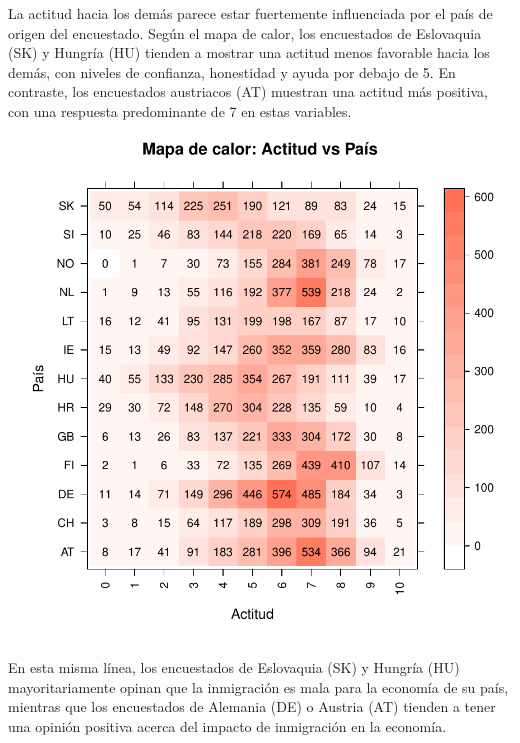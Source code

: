 \documentclass{article}
\begin{document}
La actitud hacia los demás parece estar fuertemente influenciada por el país de origen del encuestado. Según el mapa de calor, los encuestados de Eslovaquia (SK) y Hungría (HU) tienden a mostrar una actitud menos favorable hacia los demás, con niveles de confianza, honestidad y ayuda por debajo de 5. En contraste, los encuestados austriacos (AT) muestran una actitud más positiva, con una respuesta predominante de 7 en estas variables.

\includegraphics{Informe_resultados-003}

En esta misma línea, los encuestados de Eslovaquia (SK) y Hungría (HU) mayoritariamente opinan que la inmigración es mala para la economía de su país, mientras que los encuestados de Alemania (DE) o Austria (AT) tienden a tener una opinión positiva acerca del impacto de inmigración en la economía.
\end{document}
